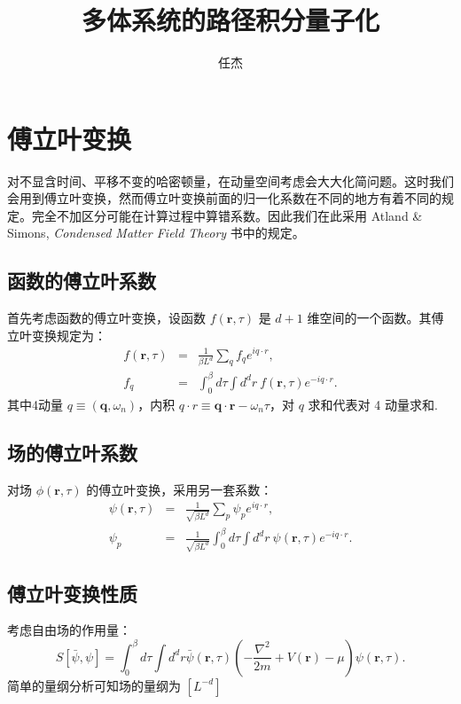 \documentclass[UTF8]{ctexart}
\begin{document}
\title{多体系统的路径积分量子化}
\date{任杰}

\maketitle


\section*{傅立叶变换}
\noindent 对不显含时间、平移不变的哈密顿量，在动量空间考虑会大大化简问题。这时我们会用到傅立叶变换，然而傅立叶变换前面的归一化系数在不同的地方有着不同的规定。完全不加区分可能在计算过程中算错系数。因此我们在此采用 Atland \& Simons, \textit{Condensed Matter Field Theory} 书中的规定。
\subsection*{函数的傅立叶系数}
\noindent 首先考虑函数的傅立叶变换，设函数 $f(\bm r,\tau)$ 是 $d+1$ 维空间的一个函数。其傅立叶变换规定为：
\begin{eqnarray}
	f(\bm r,\tau) &=& \frac{1}{\beta L^d} \sum_q f_q e^{i q\cdot r}, \\
	f_q &=& \int_0^\beta d\tau \int d^d r \ f(\bm r,\tau)e^{-iq\cdot r}.
\end{eqnarray}
其中4动量 $q\equiv(\bm q,\omega_n)$，内积 $q\cdot r \equiv \bm q\cdot \bm r - \omega_n \tau$，对 $q$ 求和代表对 4 动量求和.

\subsection*{场的傅立叶系数}
\noindent 对场 $\phi(\bm r,\tau)$ 的傅立叶变换，采用另一套系数：
\begin{eqnarray}
	\psi(\bm r,\tau) &=& \frac{1}{\sqrt{\beta L^d}}\sum_p \psi_p e^{i q\cdot r}, \\
	\psi_p &=& \frac{1}{\sqrt{\beta L^d}}\int_0^\beta d\tau \int d^d r\ \psi(\bm r,\tau) e^{-i q\cdot r}.
\end{eqnarray}

\subsection*{傅立叶变换性质}
\noindent 考虑自由场的作用量：
\begin{equation}
	S[\bar\psi,\psi] = \int_0^\beta d\tau \int d^d r
	\bar\psi(\bm r,\tau) \left(-\frac{\nabla^2}{2m}+V(\bm r)-\mu \right)\psi(\bm r,\tau).
\end{equation}
简单的量纲分析可知场的量纲为 $[L^{-d}]$
\end{document}
